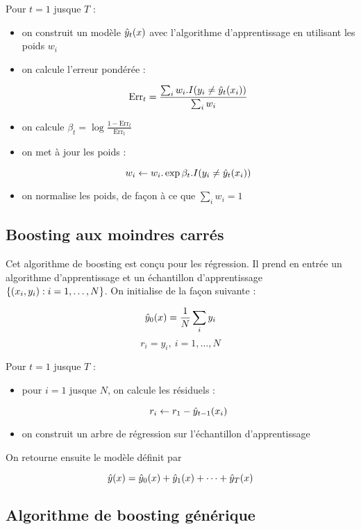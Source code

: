 	Pour $t = 1$ jusque $T$ :
	
	\begin{itemize}
		\item on construit un modèle $\hat{y}_t(x)$ avec l'algorithme d'apprentissage en utilisant les poids $w_i$
		\item on calcule l'erreur pondérée :
		
		$$\text{Err}_t = \frac{\sum_i w_i . I(y_i \neq \hat{y}_t(x_i))}{\sum_i w_i}$$
		
		\item on calcule $\beta_t = \log{\frac{1 - \text{Err}_t}{\text{Err}_t}}$
		\item on met à jour les poids :
		
		$$w_i \leftarrow w_i . \exp{\beta_t . I(y_i \neq \hat{y}_t(x_i))}$$
		
		\item on normalise les poids, de façon à ce que $\sum_i w_i = 1$
	\end{itemize}
	
		
	\subsection{Boosting aux moindres carrés}
	
	Cet algorithme de boosting est conçu pour les régression. Il prend en entrée un algorithme d'apprentissage et un échantillon d'apprentissage $\lbrace (x_i, y_i) : i = 1, \dots , N \rbrace$. On initialise de la façon suivante :
	
	$$\hat{y}_0(x) = \frac{1}{N} \sum_i y_i$$
	$$r_i = y_i, \: i = 1, \dots , N$$
	
	
	Pour $t = 1$ jusque $T$ :
	
	\begin{itemize}
		\item pour $i = 1$ jusque $N$, on calcule les résiduels :
		
		$$r_i \leftarrow r_1 - \hat{y}_{t - 1}(x_i)$$
		
		\item on construit un arbre de régression sur l'échantillon d'apprentissage
	\end{itemize}
	
	On retourne ensuite le modèle définit par
	
	$$\hat{y}(x) = \hat{y}_0(x) + \hat{y}_1(x) + \dots + \hat{y}_T(x)$$
	
	
	\subsection{Algorithme de boosting générique}
	
